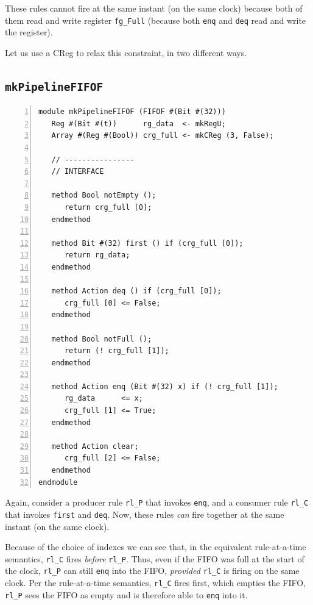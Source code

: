 These rules cannot fire at the same instant (on the same clock)
because both of them read and write register \verb|fg_Full| (because
both \verb|enq| and \verb|deq| read and write the register).

Let us use a CReg to relax this constraint, in two different ways.


\subsection{{\tt mkPipelineFIFOF}}

\label{Sec_mkPipelineFIFOF}

{\footnotesize
\begin{Verbatim}[frame=single, numbers=left]
module mkPipelineFIFOF (FIFOF #(Bit #(32)))
   Reg #(Bit #(t))      rg_data  <- mkRegU;
   Array #(Reg #(Bool)) crg_full <- mkCReg (3, False);

   // ----------------
   // INTERFACE

   method Bool notEmpty ();
      return crg_full [0];
   endmethod

   method Bit #(32) first () if (crg_full [0]);
      return rg_data;
   endmethod

   method Action deq () if (crg_full [0]);
      crg_full [0] <= False;
   endmethod

   method Bool notFull ();
      return (! crg_full [1]);
   endmethod

   method Action enq (Bit #(32) x) if (! crg_full [1]);
      rg_data      <= x;
      crg_full [1] <= True;
   endmethod

   method Action clear;
      crg_full [2] <= False;
   endmethod
endmodule
\end{Verbatim}
}

Again, consider a producer rule \verb|rl_P| that invokes \verb|enq|,
and a consumer rule \verb|rl_C| that invokes \verb|first| and
\verb|deq|.  Now, these rules \emph{can} fire together at the same
instant (on the same clock).

Because of the choice of indexes we can see that, in the equivalent
rule-at-a-time semantics, \verb|rl_C| fires \emph{before} \verb|rl_P|.
Thus, even if the FIFO was full at the start of the clock, \verb|rl_P|
can still \verb|enq| into the FIFO, \emph{provided} \verb|rl_C| is
firing on the same clock.  Per the rule-at-a-time semantics,
\verb|rl_C| fires first, which empties the FIFO, {\ie} \verb|rl_P|
sees the FIFO as empty and is therefore able to \verb|enq| into it.

